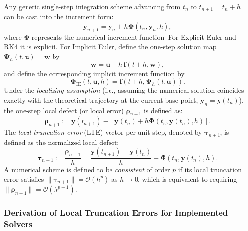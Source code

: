 \documentclass[11pt,a4paper]{article}
\theoremstyle{definition}
\theoremstyle{remark}
\begin{document}
Any generic single-step integration scheme advancing from $t_n$ to $t_{n+1}=t_n+h$ can be cast into the increment form:
\begin{equation}
\label{eq:general_increment_function}
\mathbf{y}_{n+1} = \mathbf{y}_n + h \mathbf{\Phi}(t_n, \mathbf{y}_n, h),
\end{equation}
where $\mathbf{\Phi}$ represents the numerical increment function. For Explicit Euler and RK4 it is explicit. For Implicit Euler, define the one-step solution map $\boldsymbol{\Psi}_h(t,\mathbf{u})=\mathbf{w}$ by
\begin{equation}
\label{eq:implicit_one_step_map}
\mathbf{w}=\mathbf{u}+h\,\mathbf{f}(t+h,\mathbf{w}),
\end{equation}
and define the corresponding implicit increment function by
\begin{equation}
\label{eq:implicit_increment_function}
\mathbf{\Phi}_{\mathrm{IE}}(t,\mathbf{u},h)=\mathbf{f}\left(t+h,\boldsymbol{\Psi}_h(t,\mathbf{u})\right).
\end{equation}
Under the \emph{localizing assumption} (i.e., assuming the numerical solution coincides exactly with the theoretical trajectory at the current base point, $\mathbf{y}_n = \mathbf{y}(t_n)$), the one-step local defect (or local error) $\boldsymbol{\rho}_{n+1}$ is defined as:
\begin{equation}
\label{eq:local_defect_def}
\boldsymbol{\rho}_{n+1} := \mathbf{y}(t_{n+1}) - \left[ \mathbf{y}(t_n) + h \mathbf{\Phi}(t_n, \mathbf{y}(t_n), h) \right].
\end{equation}
The \emph{local truncation error} (LTE) vector per unit step, denoted by $\boldsymbol{\tau}_{n+1}$, is defined as the normalized local defect:
\begin{equation}
\label{eq:lte_def}
\boldsymbol{\tau}_{n+1} := \frac{\boldsymbol{\rho}_{n+1}}{h} = \frac{\mathbf{y}(t_{n+1}) - \mathbf{y}(t_n)}{h} - \mathbf{\Phi}(t_n, \mathbf{y}(t_n), h).
\end{equation}
A numerical scheme is defined to be \emph{consistent} of order $p$ if its local truncation error satisfies $\|\boldsymbol{\tau}_{n+1}\| = \mathcal{O}(h^p)$ as $h \to 0$, which is equivalent to requiring $\|\boldsymbol{\rho}_{n+1}\| = \mathcal{O}(h^{p+1})$.

\subsubsection{Derivation of Local Truncation Errors for Implemented Solvers}
\end{document}

